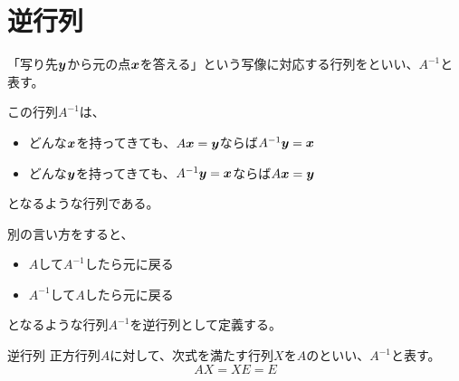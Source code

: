 \documentclass[../../../topic_linear-algebra]{subfiles}
\begin{document}
\sectionline
\section{逆行列}

「写り先$\vb*{y}$から元の点$\vb*{x}$を答える」という写像に対応する行列をといい、$A^{-1}$と表す。

\br

この行列$A^{-1}$は、
\begin{itemize}
  \item どんな$\vb*{x}$を持ってきても、$A\vb*{x} = \vb*{y}$ならば$A^{-1}\vb*{y} = \vb*{x}$
  \item どんな$\vb*{y}$を持ってきても、$A^{-1}\vb*{y} = \vb*{x}$ならば$A\vb*{x} = \vb*{y}$
\end{itemize}
となるような行列である。

\begin{center}
\end{center}

別の言い方をすると、
\begin{itemize}
  \item $A$して$A^{-1}$したら元に戻る
  \item $A^{-1}$して$A$したら元に戻る
\end{itemize}
となるような行列$A^{-1}$を逆行列として定義する。

\begin{definition}{逆行列}
  正方行列$A$に対して、次式を満たす行列$X$を$A$のといい、$A^{-1}$と表す。
  \begin{equation*}
    AX = XE = E
  \end{equation*}
\end{definition}
\end{document}
